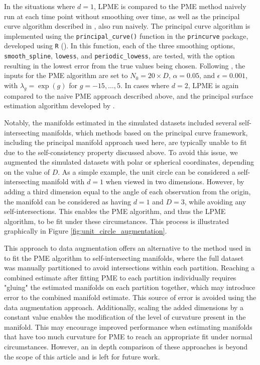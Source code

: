 \documentclass[11pt,reqno]{article}
\theoremstyle{definition}
\begin{document}
In the situations where $d = 1$, LPME is compared to the PME method naively run at each time point without smoothing over time, as well as the principal curve algorithm described in \cite{hastiePrincipalCurves1989}, also run naively. The principal curve algorithm is implemented using the \texttt{principal\_curve()} function in the \texttt{princurve} package, developed using \texttt{R} (\cite{rSoftware2023}). In this function, each of the three smoothing options, \texttt{smooth\_spline}, \texttt{lowess}, and \texttt{periodic\_lowess}, are tested, with the option resulting in the lowest error from the true values being chosen. Following \cite{mengPrincipalManifoldEstimation2021}, the inputs for the PME algorithm are set to $N_0 = 20 \times D$, $\alpha = 0.05$, and $\epsilon = 0.001$, with $\lambda_g = \exp(g)$ for $g = -15, \dots, 5$. In cases where $d = 2$, LPME is again compared to the naive PME approach described above, and the principal surface estimation algorithm developed by \cite{yueParameterizationWhiteMatter2016}.

Notably, the manifolds estimated in the simulated datasets included several self-intersecting manifolds, which methods based on the principal curve framework, including the principal manifold approach used here, are typically unable to fit due to the self-consistency property discussed above. To avoid this issue, we augmented the simulated datasets with polar or spherical coordinates, depending on the value of $D$. As a simple example, the unit circle can be considered a self-intersecting manifold with $d = 1$ when viewed in two dimensions. However, by adding a third dimension equal to the angle of each observation from the origin, the manifold can be considered as having $d = 1$ and $D = 3$, while avoiding any self-intersections. This enables the PME algorithm, and thus the LPME algorithm, to be fit under these circumstances. This process is illustrated graphically in Figure \ref{fig:unit_circle_augmentation}. 

This approach to data augmentation offers an alternative to the method used in \cite{mengPrincipalManifoldEstimation2021} to fit the PME algorithm to self-intersecting manifolds, where the full dataset was manually partitioned to avoid intersections within each partition. Reaching a combined estimate after fitting PME to each partition individually requires "gluing" the estimated manifolds on each partition together, which may introduce error to the combined manifold estimate. This source of error is avoided using the data augmentation approach. Additionally, scaling the added dimensions by a constant value enables the modification of the level of curvature present in the manifold. This may encourage improved performance when estimating manifolds that have too much curvature for PME to reach an appropriate fit under normal circumstances. However, an in depth comparison of these approaches is beyond the scope of this article and is left for future work.
\end{document}
